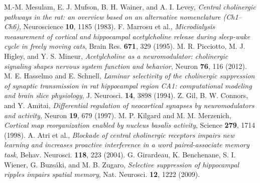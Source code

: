  M.-M. Mesulam, E. J. Mufson, B. H. Wainer, and A. I. Levey, \emph{Central cholinergic pathways in the rat: an overview based on an alternative nomenclature (Ch1--Ch6)}, Neuroscience \textbf{10}, 1185 (1983).
 F. Marrosu et al., \emph{Microdialysis measurement of cortical and hippocampal acetylcholine release during sleep-wake cycle in freely moving cats}, Brain Res. \textbf{671}, 329 (1995).
 M. R. Picciotto, M. J. Higley, and Y. S. Mineur, \emph{Acetylcholine as a neuromodulator: cholinergic signaling shapes nervous system function and behavior}, Neuron \textbf{76}, 116 (2012).
 M. E. Hasselmo and E. Schnell, \emph{Laminar selectivity of the cholinergic suppression of synaptic transmission in rat hippocampal region CA1: computational modeling and brain slice physiology}, J. Neurosci. \textbf{14}, 3898 (1994).
 Z. Gil, B. W. Connors, and Y. Amitai, \emph{Differential regulation of neocortical synapses by neuromodulators and activity}, Neuron \textbf{19}, 679 (1997).
 M. P. Kilgard and M. M. Merzenich, \emph{Cortical map reorganization enabled by nucleus basalis activity}, Science \textbf{279}, 1714 (1998).
 A. Atri et al., \emph{Blockade of central cholinergic receptors impairs new learning and increases proactive interference in a word paired-associate memory task}, Behav. Neurosci. \textbf{118}, 223 (2004).
 G. Girardeau, K. Benchenane, S. I. Wiener, G. Buzs\'aki, and M. B. Zugaro, \emph{Selective suppression of hippocampal ripples impairs spatial memory}, Nat. Neurosci. \textbf{12}, 1222 (2009).

